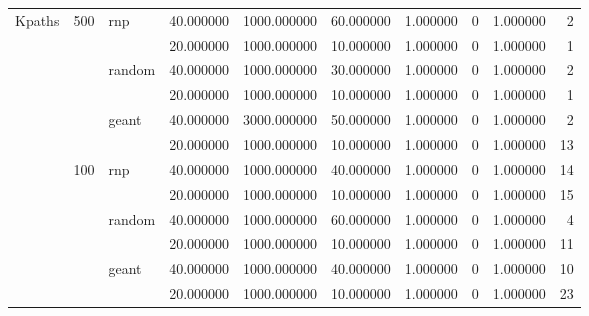 \begin{tabular}{llllllllrr}
\multirow[t]{12}{*}{Kpaths} & \multirow[t]{6}{*}{500} & \multirow[t]{2}{*}{rnp} & 40.000000 & 1000.000000 & 60.000000 & 1.000000 & 0 & 1.000000 & 2 \\
\cline{4-10} \cline{5-10} \cline{6-10} \cline{7-10}
 &  &  & 20.000000 & 1000.000000 & 10.000000 & 1.000000 & 0 & 1.000000 & 1 \\
\cline{3-10} \cline{4-10} \cline{5-10} \cline{6-10} \cline{7-10}
 &  & \multirow[t]{2}{*}{random} & 40.000000 & 1000.000000 & 30.000000 & 1.000000 & 0 & 1.000000 & 2 \\
\cline{4-10} \cline{5-10} \cline{6-10} \cline{7-10}
 &  &  & 20.000000 & 1000.000000 & 10.000000 & 1.000000 & 0 & 1.000000 & 1 \\
\cline{3-10} \cline{4-10} \cline{5-10} \cline{6-10} \cline{7-10}
 &  & \multirow[t]{2}{*}{geant} & 40.000000 & 3000.000000 & 50.000000 & 1.000000 & 0 & 1.000000 & 2 \\
\cline{4-10} \cline{5-10} \cline{6-10} \cline{7-10}
 &  &  & 20.000000 & 1000.000000 & 10.000000 & 1.000000 & 0 & 1.000000 & 13 \\
\cline{2-10} \cline{3-10} \cline{4-10} \cline{5-10} \cline{6-10} \cline{7-10}
 & \multirow[t]{6}{*}{100} & \multirow[t]{2}{*}{rnp} & 40.000000 & 1000.000000 & 40.000000 & 1.000000 & 0 & 1.000000 & 14 \\
\cline{4-10} \cline{5-10} \cline{6-10} \cline{7-10}
 &  &  & 20.000000 & 1000.000000 & 10.000000 & 1.000000 & 0 & 1.000000 & 15 \\
\cline{3-10} \cline{4-10} \cline{5-10} \cline{6-10} \cline{7-10}
 &  & \multirow[t]{2}{*}{random} & 40.000000 & 1000.000000 & 60.000000 & 1.000000 & 0 & 1.000000 & 4 \\
\cline{4-10} \cline{5-10} \cline{6-10} \cline{7-10}
 &  &  & 20.000000 & 1000.000000 & 10.000000 & 1.000000 & 0 & 1.000000 & 11 \\
\cline{3-10} \cline{4-10} \cline{5-10} \cline{6-10} \cline{7-10}
 &  & \multirow[t]{2}{*}{geant} & 40.000000 & 1000.000000 & 40.000000 & 1.000000 & 0 & 1.000000 & 10 \\
\cline{4-10} \cline{5-10} \cline{6-10} \cline{7-10}
 &  &  & 20.000000 & 1000.000000 & 10.000000 & 1.000000 & 0 & 1.000000 & 23 \\
\cline{1-10} \cline{2-10} \cline{3-10} \cline{4-10} \cline{5-10} \cline{6-10} \cline{7-10}
\bottomrule
\end{tabular}
